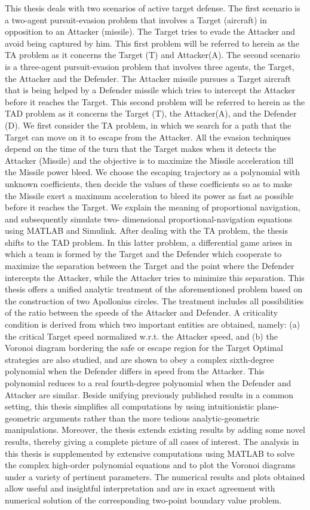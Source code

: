 
This thesis deals with two scenarios of active target defense. The first scenario is a two-agent pursuit-evasion problem that involves a Target (aircraft) in opposition to an Attacker (missile). The Target tries to evade the Attacker and avoid being captured by him. This first problem will be referred to herein as the TA problem as it concerns the Target (T) and Attacker(A). The second scenario is a three-agent pursuit-evasion problem that involves three agents, the Target, the Attacker and the Defender. The Attacker missile pursues a Target aircraft that is being helped by a Defender missile which tries to intercept the Attacker before it reaches the Target. This second problem will be referred to herein as the TAD problem as it concerns the Target (T), the Attacker(A), and the Defender (D). We first consider the TA problem, in which we search for a path that the Target can move on it to escape from the Attacker. All the evasion techniques depend on the time of the turn that the Target makes when it detects the Attacker (Missile) and the objective is to maximize the Missile acceleration till the Missile power bleed. We choose the escaping trajectory as a polynomial with unknown coefficients, then decide the values of these coefficients so as to make the Missile exert a maximum acceleration to bleed its power as fast as possible before it reaches the Target. We explain the meaning of proportional navigation, and subsequently simulate two- dimensional proportional-navigation equations using MATLAB and Simulink.
 After dealing with the TA problem, the thesis shifts to the TAD problem. In this latter problem, a differential game arises in which a team is formed by the Target and the Defender which cooperate to maximize the separation between the Target and the point where the Defender intercepts the Attacker, while the Attacker tries to minimize this separation. This thesis offers a unified analytic treatment of the aforementioned problem based on the construction of two Apollonius circles. The treatment includes all possibilities of the ratio between the speeds of the Attacker and Defender. A criticality condition is derived from which two important entities are obtained, namely: (a) the critical Target speed normalized w.r.t. the Attacker speed, and (b) the Voronoi diagram bordering the safe or escape region for the Target Optimal strategies are also studied, and are shown to obey a complex sixth-degree polynomial when the Defender differs in speed from the Attacker. This polynomial reduces to a real fourth-degree polynomial when the Defender and Attacker are similar. Beside unifying previously published results in a common setting, this thesis simplifies all computations by using intuitionistic plane-geometric arguments rather than the more tedious analytic-geometric manipulations. Moreover, the thesis extends existing results by adding some novel results, thereby giving a complete picture of all cases of interest. The analysis in this thesis is supplemented by extensive computations using MATLAB to solve the complex high-order polynomial equations and to plot the Voronoi diagrams under a variety of pertinent parameters. The numerical results and plots obtained allow useful and insightful interpretation and are in exact agreement with numerical solution of the corresponding two-point boundary value problem.
